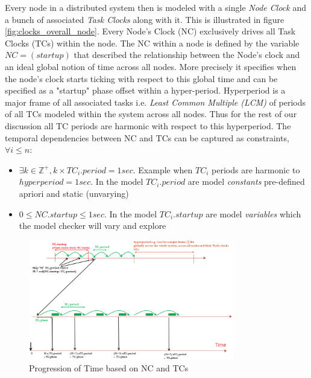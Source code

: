 Every node in a distributed system then is modeled with a single \emph{Node Clock} and a bunch of associated \emph{Task Clocks} along with it. This is illustrated in figure \ref{fig:clocks_overall_node}. Every Node’s Clock (NC) exclusively drives all Task Clocks (TCs) within the node.  The NC within a node is defined by the variable $NC=(startup)$ that described the relationship between the Node's clock and an ideal global notion of time across all nodes. More precisely it specifies when the node's clock starts ticking with respect to this global time and can be specified as a "startup" phase offset within a hyper-period. Hyperperiod is a major frame of all associated tasks i.e. \emph{Least Common Multiple (LCM)} of periods of all TCs modeled within the system across all nodes. Thus for the rest of our discussion all TC periods are harmonic with respect to this hyperperiod. The temporal dependencies between NC and TCs can be captured as constraints, $\forall i \leq n$:
\begin{itemize}
\item $\exists k \in \mathbb{Z}^+, k \times TC_i.period = 1 sec$. Example when $TC_i$ periods are harmonic to $hyperperiod = 1 sec$. In the model $TC_i.period$ are model \emph{constants} pre-defined apriori and static (unvarying)
\item $0 \leq NC.startup \leq 1 sec$. In the model $TC_i.startup$ are model \emph{variables} which the model checker will vary and explore
\end{itemize}

\begin{figure}
\begin{center}
\includegraphics[width=0.8\textwidth]{figures/node_task_clocks}
\caption{Progression of Time based on NC and TCs}
\label{fig:node_task_clocks}
\end{center}
\end{figure}

